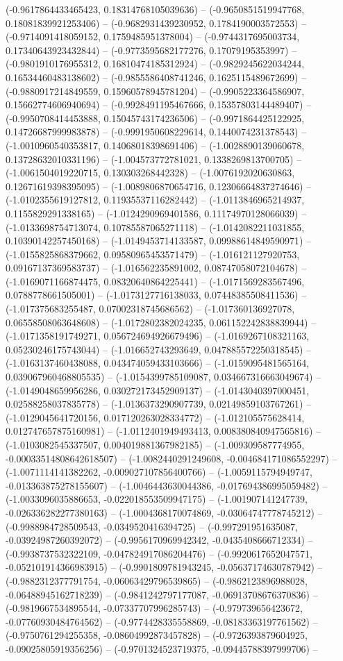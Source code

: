 (-0.9617864433465423, 0.18314768105039636) -- (-0.9650851519947768, 0.18081839921253406) -- (-0.9682931439230952, 0.1784190003572553) -- (-0.9714091418059152, 0.1759485951378004) -- (-0.9744317695003734, 0.17340643923432844) -- (-0.9773595682177276, 0.17079195353997) -- (-0.9801910176955312, 0.16810474185312924) -- (-0.9829245622034244, 0.16534460483138602) -- (-0.9855586408741246, 0.1625115489672699) -- (-0.9880917214849559, 0.15960578945781204) -- (-0.9905223364586907, 0.15662774606940694) -- (-0.9928491195467666, 0.15357803144489407) -- (-0.9950708414453888, 0.15045743174236506) -- (-0.9971864425122925, 0.14726687999983878) -- (-0.9991950608229614, 0.1440074231378543) -- (-1.0010960540353817, 0.14068018398691406) -- (-1.0028890139060678, 0.13728632010331196) -- (-1.004573772781021, 0.1338269813700705) -- (-1.0061504019220715, 0.130303268442328) -- (-1.0076192020630863, 0.12671619398395095) -- (-1.0089806870654716, 0.12306664837274646) -- (-1.0102355619127812, 0.11935537116282442) -- (-1.0113846965214937, 0.1155829291338165) -- (-1.0124290969401586, 0.11174970128066039) -- (-1.0133698754713074, 0.10785587065271118) -- (-1.0142082211031855, 0.10390142257450168) -- (-1.0149453714133587, 0.09988614849590971) -- (-1.0155825868379662, 0.09580965453571479) -- (-1.016121127920753, 0.09167137369583737) -- (-1.016562235891002, 0.08747058072104678) -- (-1.0169071166874475, 0.08320640864225441) -- (-1.0171569283567496, 0.0788778661505001) -- (-1.0173127716138033, 0.07448385508411536) -- (-1.017375683255487, 0.07002318745686562) -- (-1.017360136927078, 0.06558508063648608) -- (-1.0172802382024235, 0.061152242838839944) -- (-1.0171358191749271, 0.056724694926679496) -- (-1.0169267108321163, 0.05230246175743044) -- (-1.016652743293649, 0.047885572250318545) -- (-1.0163137460438088, 0.043474059433103666) -- (-1.0159095481565164, 0.039067960468805535) -- (-1.0154399785109087, 0.034667316663049674) -- (-1.0149048659956286, 0.030272173452909137) -- (-1.0143040397000451, 0.02588258037835778) -- (-1.0136373290907739, 0.02149859103767261) -- (-1.0129045641720156, 0.017120263028334772) -- (-1.012105575628414, 0.012747657875160981) -- (-1.0112401949493413, 0.008380840947565816) -- (-1.0103082545337507, 0.004019881367982185) -- (-1.009309587774955, -0.00033514808642618507) -- (-1.0082440291249608, -0.004684171086552297) -- (-1.0071114141382262, -0.009027107856400766) -- (-1.0059115794949747, -0.013363875278155607) -- (-1.0046443630044386, -0.017694386995059482) -- (-1.0033096035886653, -0.022018553509947175) -- (-1.001907141247739, -0.026336282277380163) -- (-1.0004368170074869, -0.03064747778745212) -- (-0.9988984728509543, -0.0349520416394725) -- (-0.997291951635087, -0.03924987260392072) -- (-0.9956170969942342, -0.0435408666712334) -- (-0.9938737532322109, -0.047824917086204476) -- (-0.9920617652047571, -0.052101914366983915) -- (-0.9901809781943245, -0.05637174630787942) -- (-0.9882312377791754, -0.06063429796539865) -- (-0.9862123896988028, -0.06488945162718239) -- (-0.9841242797177087, -0.06913708676370836) -- (-0.9819667534895544, -0.07337707996285743) -- (-0.979739656423672, -0.07760930484764562) -- (-0.9774428335558869, -0.08183363197761562) -- (-0.9750761294255358, -0.08604992873457828) -- (-0.9726393879604925, -0.09025805919356256) -- (-0.9701324523719375, -0.09445788397999706) -- 
